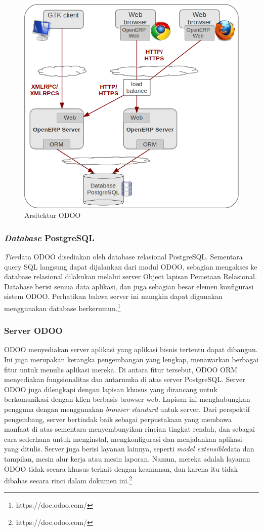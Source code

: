 	\begin{figure}[H]
	\centering
	\includegraphics[scale=0.4]{Gambar/arsitekturOdoo3}
	\caption{Arsitektur ODOO}
	\end{figure}

\subsubsection{\textit{Database} PostgreSQL}
\textit{Tier}data ODOO disediakan oleh database relasional PostgreSQL. Sementara query SQL langsung dapat dijalankan dari modul ODOO, sebagian mengakses ke database relasional dilakukan melalui server Object lapisan Pemetaan Relasional.
Database berisi semua data aplikasi, dan juga sebagian besar elemen konfigurasi sistem  ODOO. Perhatikan bahwa server ini mungkin dapat digunakan menggunakan database berkerumun.\footnote{https://doc.odoo.com/}

\subsubsection{Server ODOO }
 ODOO menyediakan server aplikasi yang aplikasi bisnis tertentu dapat dibangun. Ini juga merupakan kerangka pengembangan yang lengkap, menawarkan berbagai fitur untuk menulis aplikasi mereka. Di antara fitur tersebut,  ODOO ORM menyediakan fungsionalitas dan antarmuka di atas server PostgreSQL. Server  ODOO juga dilengkapi dengan lapisan khusus yang dirancang untuk berkomunikasi dengan klien berbasis browser web. Lapisan ini menghubungkan pengguna dengan menggunakan \textit{browser standard} untuk server.
Dari perspektif pengembang, server bertindak baik sebagai perpustakaan yang membawa manfaat di atas sementara menyembunyikan rincian tingkat rendah, dan sebagai cara sederhana untuk menginstal, mengkonfigurasi dan menjalankan aplikasi yang ditulis. Server juga berisi layanan lainnya, seperti \textit{model extensible}data dan tampilan, mesin alur kerja atau mesin laporan. Namun, mereka adalah layanan  ODOO tidak secara khusus terkait dengan keamanan, dan karena itu tidak dibahas secara rinci dalam dokumen ini.\footnote{https://doc.odoo.com/}

